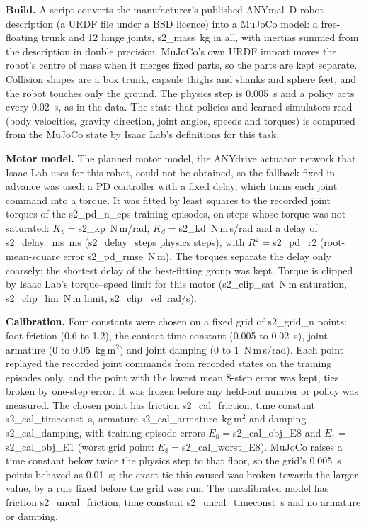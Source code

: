 \textbf{Build.} A script converts the manufacturer's published ANYmal~D robot description (a URDF file under a BSD
licence) into a MuJoCo model: a free-floating trunk and 12 hinge joints, {{s2_mass}}~kg in all, with inertias summed
from the description in double precision. MuJoCo's own URDF import moves the robot's centre of mass when it merges
fixed parts, so the parts are kept separate. Collision shapes are a box trunk, capsule thighs and shanks and sphere
feet, and the robot touches only the ground. The physics step is 0.005~s and a policy acts every 0.02~s, as in the
data. The state that policies and learned simulators read (body velocities, gravity direction, joint angles, speeds
and torques) is computed from the MuJoCo state by Isaac Lab's definitions for this task.

\textbf{Motor model.} The planned motor model, the ANYdrive actuator network that Isaac Lab uses for this robot, could
not be obtained, so the fallback fixed in advance was used: a PD controller with a fixed delay, which turns each
joint command into a torque. It was fitted by least squares to the recorded joint torques of the {{s2_pd_n_eps}}
training episodes, on steps whose torque was not saturated: $K_p={}${{s2_kp}}~N\,m/rad, $K_d={}${{s2_kd}}~N\,m\,s/rad
and a delay of {{s2_delay_ms}}~ms ({{s2_delay_steps}} physics steps), with $R^2={}${{s2_pd_r2}} (root-mean-square
error {{s2_pd_rmse}}~N\,m). The torques separate the delay only coarsely; the shortest delay of the best-fitting group
was kept. Torque is clipped by Isaac Lab's torque--speed limit for this motor ({{s2_clip_sat}}~N\,m saturation,
{{s2_clip_lim}}~N\,m limit, {{s2_clip_vel}}~rad/s).

\textbf{Calibration.} Four constants were chosen on a fixed grid of {{s2_grid_n}} points: foot friction (0.6 to 1.2),
the contact time constant (0.005 to 0.02~s), joint armature (0 to 0.05~kg\,m$^2$) and joint damping (0 to
1~N\,m\,s/rad). Each point replayed the recorded joint commands from recorded states on the training episodes only,
and the point with the lowest mean 8-step error was kept, ties broken by one-step error. It was frozen before any
held-out number or policy was measured. The chosen point has friction {{s2_cal_friction}}, time constant
{{s2_cal_timeconst}}~s, armature {{s2_cal_armature}}~kg\,m$^2$ and damping {{s2_cal_damping}}, with training-episode
errors $E_8={}${{s2_cal_obj_E8}} and $E_1={}${{s2_cal_obj_E1}} (worst grid point: $E_8={}${{s2_cal_worst_E8}}). MuJoCo
raises a time constant below twice the physics step to that floor, so the grid's 0.005~s points behaved as 0.01~s;
the exact tie this caused was broken towards the larger value, by a rule fixed before the grid was run. The uncalibrated
model has friction {{s2_uncal_friction}}, time constant {{s2_uncal_timeconst}}~s and no armature or damping.

